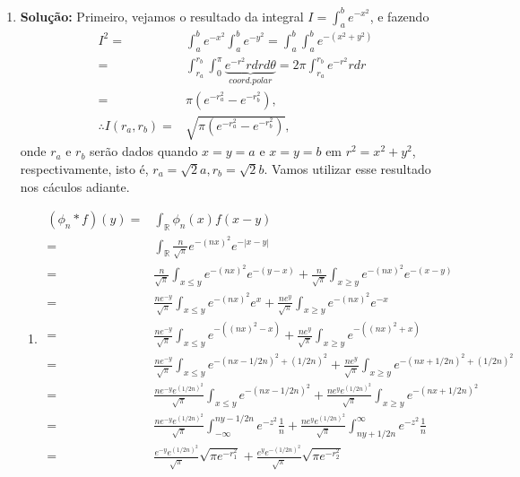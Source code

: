 \documentclass{article}
\begin{document}
\begin{enumerate}
		\item \textbf{Solução:} Primeiro, vejamos o resultado da integral $I = \int_{a}^{b} e^{-x^{2}}$, e fazendo 
		$$
		\begin{aligned}
		I^{2} = & \int_{a}^{b} e^{-x^{2}}\int_{a}^{b} e^{-y^{2}} = \int_{a}^{b} \int_{a}^{b} e^{-(x^{2}+y^{2})} 
		\\
		= & \int_{r_{a}}^{r_{b}} \int_{0}^{\pi} \underbrace{ e^{-r^{2}}r dr d\theta }_{coord. polar} = 2\pi \int_{r_{a}}^{r_{b}} e^{-r^{2}}r dr
		\\
		= & \pi (e^{-r_{a}^{2}} - e^{-r_{b}^{2}}),
		\\
		\therefore I(r_{a}, r_{b}) = & \sqrt{\pi (e^{-r_{a}^{2}} - e^{-r_{b}^{2}})},
		\end{aligned}
		$$
		onde $r_{a}$ e $r_{b}$ serão dados quando $x=y=a$ e $x=y=b$ em  $r^{2} = x^{2}+y^{2}$, respectivamente, isto é, $r_{a} = \sqrt{2}a, r_{b} = \sqrt{2}b$. Vamos utilizar esse resultado nos cáculos adiante.
			\begin{enumerate}
				\item
					$$
					\begin{aligned}
					(\phi_{n}*f)(y) = &\int_{\mathbb{R}} \phi_{n}(x)f(x-y)
					\\
					= &\int_{\mathbb{R}} \frac{n}{\sqrt{\pi}}e^{-(nx)^{2}} e^{-|x-y|}
					\\
					= & \frac{n}{\sqrt{\pi}}\int_{x \leq y} e^{-(nx)^{2}} e^{-(y-x)} + \frac{n}{\sqrt{\pi}}\int_{x \geq y} e^{-(nx)^{2}} e^{-(x-y)}
					\\
					= & \frac{ne^{-y}}{\sqrt{\pi}}\int_{x \leq y} e^{-(nx)^{2}} e^{x} + \frac{ne^{y}}{\sqrt{\pi}}\int_{x \geq y} e^{-(nx)^{2}} e^{-x}
					\\
					= & \frac{ne^{-y}}{\sqrt{\pi}}\int_{x \leq y} e^{-((nx)^{2} -x)}  + \frac{ne^{y}}{\sqrt{\pi}}\int_{x \geq y} e^{-((nx)^{2}+x)}
					\\
					= & \frac{ne^{-y}}{\sqrt{\pi}}\int_{x \leq y} e^{-(nx - 1/2n)^{2} + (1/2n)^{2}} + \frac{ne^{y}}{\sqrt{\pi}}\int_{x \geq y} e^{-(nx + 1/2n)^{2} + (1/2n)^{2}}
					\\
					= & \frac{ne^{-y}e^{ (1/2n)^{2}}}{\sqrt{\pi}}\int_{x \leq y} e^{-(nx - 1/2n)^{2}} + \frac{ne^{y}e^{ (1/2n)^{2}}}{\sqrt{\pi}}\int_{x \geq y} e^{-(nx + 1/2n)^{2}}
					\\
					= & \frac{ne^{-y}e^{(1/2n)^{2}}}{\sqrt{\pi}} \int_{-\infty}^{ny-1/2n} e^{-z^{2}}\frac{1}{n} + \frac{ne^{y}e^{ (1/2n)^{2}}}{\sqrt{\pi}}\int_{ny+1/2n}^{\infty} e^{-z^{2}}\frac{1}{n}
					\\
					= & \frac{e^{-y}e^{(1/2n)^{2}}}{\sqrt{\pi}} \sqrt{\pi e^{-r_{1}^{2}}} + \frac{e^{y}e^{ - (1/2n)^{2}}}{\sqrt{\pi}}\sqrt{\pi e^{-r_{2}^{2}}}

\end{aligned}$$
\end{enumerate}
\end{enumerate}
\end{document}
